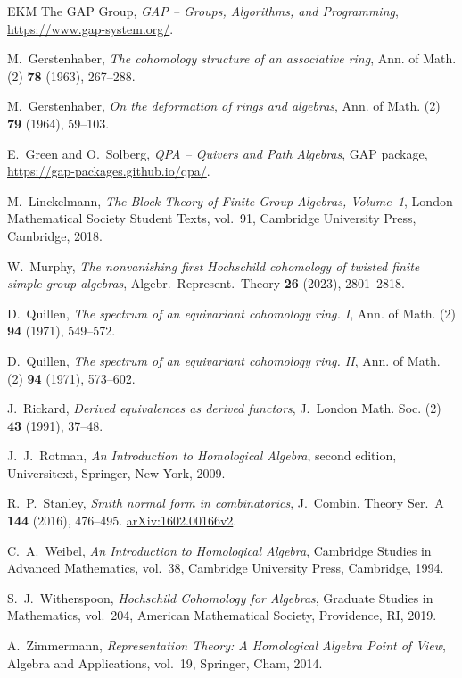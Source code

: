 \documentclass[11pt,a4paper]{amsart}
\numberwithin{equation}{section}
\begin{document}
\begin{thebibliography}{EKM}
The GAP Group,
\emph{GAP -- Groups, Algorithms, and Programming},
\url{https://www.gap-system.org/}.

M.~Gerstenhaber,
{\emph{The cohomology structure of an associative ring}},
Ann. of Math. (2) \textbf{78} (1963), 267--288.

M.~Gerstenhaber,
{\emph{On the deformation of rings and algebras}},
Ann. of Math. (2) \textbf{79} (1964), 59--103.

E.~Green and O.~Solberg,
\emph{QPA -- Quivers and Path Algebras},
GAP package, \url{https://gap-packages.github.io/qpa/}.

M.~Linckelmann,
\emph{The Block Theory of Finite Group Algebras, Volume~1},
London Mathematical Society Student Texts, vol.~91,
Cambridge University Press, Cambridge, 2018.

W.~Murphy,
\emph{The nonvanishing first Hochschild cohomology of twisted
finite simple group algebras},
Algebr.\ Represent.\ Theory \textbf{26} (2023), 2801--2818.

D.~Quillen,
{\emph{The spectrum of an equivariant cohomology ring. I}},
Ann. of Math. (2) \textbf{94} (1971), 549--572.

D.~Quillen,
{\emph{The spectrum of an equivariant cohomology ring. II}},
Ann. of Math. (2) \textbf{94} (1971), 573--602.

J.~Rickard,
{\emph{Derived equivalences as derived functors}},
J.~London Math. Soc. (2) \textbf{43} (1991), 37--48.

J.~J.~Rotman,
{\emph{An Introduction to Homological Algebra}},
second edition, Universitext,
Springer, New York, 2009.


R.~P.~Stanley,
{\emph{Smith normal form in combinatorics}},
J.~Combin. Theory Ser.~A \textbf{144} (2016), 476--495.
\href{https://arxiv.org/abs/1602.00166v2}{arXiv:1602.00166v2}.

C.~A.~Weibel,
{\emph{An Introduction to Homological Algebra}},
Cambridge Studies in Advanced Mathematics, vol.~38,
Cambridge University Press, Cambridge, 1994.

S.~J.~Witherspoon,
{\emph{Hochschild Cohomology for Algebras}},
Graduate Studies in Mathematics, vol.~204,
American Mathematical Society, Providence, RI, 2019.

A.~Zimmermann,
{\emph{Representation Theory:
A Homological Algebra Point of View}},
Algebra and Applications, vol.~19,
Springer, Cham, 2014.


\end{thebibliography}
\end{document}
